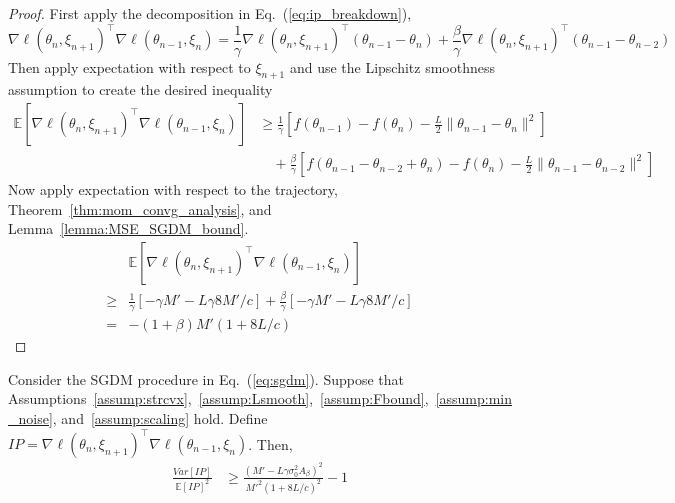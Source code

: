 \documentclass[conference]{IEEEtran}
\newcommand{\Ex}[1]{\mathbb{E}[ #1 ]}
\newenvironment{customthm}[1]
   {\renewcommand\theinnercustomthm{#1}\innercustomthm}
   {\endinnercustomthm}
\begin{document}
\begin{proof}
First apply the decomposition in Eq.~(\ref{eq:ip_breakdown}), 
\begin{equation*}
\nabla \ell ( \theta_n, \xi_{n+1} )^\top \nabla \ell ( \theta_{n-1}, \xi_n )
= \frac{1}{\gamma} \nabla \ell ( \theta_n, \xi_{n+1} )^\top ( \theta_{n-1} - \theta_n ) 
+ \frac{\beta}{\gamma}  \nabla \ell ( \theta_n, \xi_{n+1} )^\top ( \theta_{n-1} - \theta_{n-2} )
\end{equation*}
Then apply expectation with respect to $\xi_{n+1}$ and use the Lipschitz smoothness assumption to create the desired inequality
\begin{align*}
\Ex{ \nabla \ell ( \theta_n, \xi_{n+1} )^\top \nabla \ell ( \theta_{n-1}, \xi_n ) }
&\geq \frac{1}{\gamma} [ f ( \theta_{n-1} ) - f ( \theta_n ) - \frac{L}{2} \| \theta_{n-1} - \theta_n \|^2 ] \\
&\quad + \frac{\beta}{\gamma} [ f ( \theta_{n-1} - \theta_{n-2} + \theta_n ) - f ( \theta_n ) - \frac{L}{2} \| \theta_{n-1} - \theta_{n-2} \|^2 ]
\end{align*}
Now apply expectation with respect to the trajectory, Theorem~\ref{thm:mom_convg_analysis}, and Lemma~\ref{lemma:MSE_SGDM_bound}.
\begin{align*}
&\Ex{ \nabla \ell ( \theta_n, \xi_{n+1} )^\top \nabla \ell ( \theta_{n-1}, \xi_n ) }\\
\geq& \frac{1}{\gamma} [ - \gamma M' - L \gamma 8 M' / c ]
+ \frac{\beta}{\gamma} [ - \gamma M' - L \gamma 8 M' / c ] \\
=& - (1 + \beta ) M' (1 + 8L/c )
\end{align*}
\end{proof}


\begin{customthm}{\ref{thm:ip_var_bound}} 
Consider the SGDM procedure in Eq.~(\ref{eq:sgdm}). Suppose that Assumptions~\ref{assump:strcvx},~\ref{assump:Lsmooth},~\ref{assump:Fbound},~\ref{assump:min_noise}, and~\ref{assump:scaling} hold. Define $IP = \nabla \ell(\theta_n, \xi_{n+1})^\top \nabla \ell(\theta_{n-1}, \xi_n)$.
Then,
\begin{align*}
\frac{Var [ IP ]}{\mathbb{E} [ IP ]^2} 
&\geq \frac{ ( M' - L \gamma \sigma_0^2 A_\beta )^2 }{M'^2 ( 1 + 8 L / c )^2 } 
- 1
\end{align*}
\end{customthm}
\end{document}
